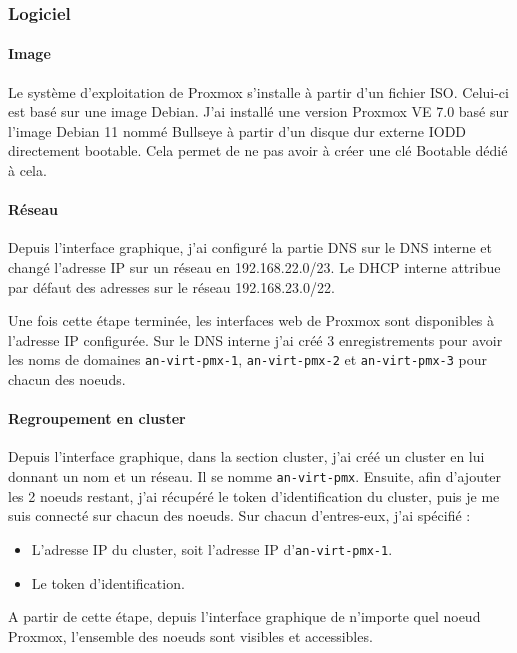 \documentclass[12pt]{article}
\begin{document}
\subsubsection{Logiciel}
\paragraph{Image}
Le système d'exploitation de Proxmox s'installe à partir d'un fichier ISO. Celui-ci est basé sur une image Debian. 
J'ai installé une version Proxmox VE 7.0 basé sur l'image Debian 11 nommé Bullseye à partir d'un disque dur externe IODD directement bootable. 
Cela permet de ne pas avoir à créer une clé Bootable dédié à cela.

\paragraph{Réseau}
Depuis l'interface graphique, j'ai configuré la partie DNS sur le DNS interne et changé l'adresse IP sur un réseau en 192.168.22.0/23. 
Le DHCP interne attribue par défaut des adresses sur le réseau 192.168.23.0/22.

Une fois cette étape terminée, les interfaces web de Proxmox sont disponibles à l'adresse IP configurée. 
Sur le DNS interne j'ai créé 3 enregistrements pour avoir les noms de domaines \verb|an-virt-pmx-1|, \verb|an-virt-pmx-2| et \verb|an-virt-pmx-3| pour chacun des noeuds.

\paragraph{Regroupement en cluster}
Depuis l'interface graphique, dans la section cluster, j'ai créé un cluster en lui donnant un nom et un réseau. Il se nomme \verb|an-virt-pmx|.
Ensuite, afin d'ajouter les 2 noeuds restant, j'ai récupéré le token d'identification du cluster, puis je me suis connecté sur chacun des noeuds. 
Sur chacun d'entres-eux, j'ai spécifié :
\begin{itemize}
    \item L'adresse IP du cluster, soit l'adresse IP d'\verb|an-virt-pmx-1|.
    \item Le token d'identification.
\end{itemize}

A partir de cette étape, depuis l'interface graphique de n'importe quel noeud Proxmox, l'ensemble des noeuds sont visibles et accessibles.
\end{document}
